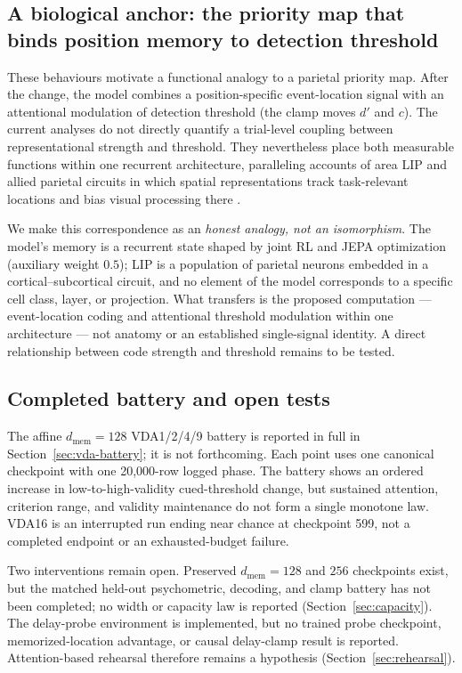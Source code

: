 \subsection*{A biological anchor: the priority map that binds position memory to detection threshold}

These behaviours motivate a functional analogy to a parietal priority
map. After the change, the model combines a position-specific event-location signal with an
attentional modulation of detection threshold (the clamp moves $d'$ and
$c$). The current analyses do not directly quantify a trial-level coupling
between representational strength and threshold. They nevertheless place
both measurable functions within one recurrent architecture, paralleling
accounts of area LIP and allied parietal circuits in which spatial representations
track task-relevant locations and bias visual processing there \cite{bisley_goldberg2010}.

We make this correspondence as an \emph{honest analogy, not an
isomorphism}. The model's memory is a recurrent state shaped by joint RL and JEPA optimization
(auxiliary weight $0.5$);
LIP is a population of parietal neurons embedded in a
cortical--subcortical circuit, and no element of the model corresponds to
a specific cell class, layer, or projection. What transfers is the
proposed computation --- event-location coding and attentional threshold
modulation within one architecture --- not anatomy or an established
single-signal identity. A direct relationship between code strength and
threshold remains to be tested.

\subsection*{Completed battery and open tests}

The affine $d_{\mathrm{mem}}=128$ VDA1/2/4/9 battery is reported in full
in Section~\ref{sec:vda-battery}; it is not forthcoming. Each point uses
one canonical checkpoint with one 20{,}000-row logged phase. The battery
shows an ordered increase in low-to-high-validity cued-threshold change,
but sustained attention, criterion range, and validity maintenance do not
form a single monotone law. VDA16 is an interrupted run ending near chance
at checkpoint 599, not a completed endpoint or an exhausted-budget
failure.

Two interventions remain open. Preserved $d_{\mathrm{mem}}=128$ and $256$
checkpoints exist, but the matched held-out psychometric, decoding, and
clamp battery has not been completed; no width or capacity law is reported
(Section~\ref{sec:capacity}). The delay-probe environment is implemented,
but no trained probe checkpoint, memorized-location advantage, or causal
delay-clamp result is reported. Attention-based rehearsal therefore
remains a hypothesis (Section~\ref{sec:rehearsal}).

